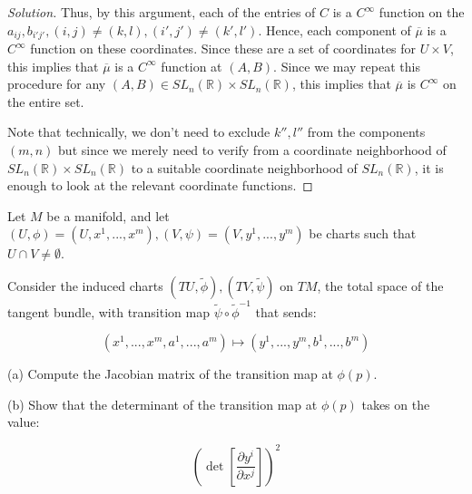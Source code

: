 \documentclass[10pt]{article}
\theoremstyle{nonumberplain}%
\newenvironment{problem}[2][]{\begin{trivlist}
\item[\hskip \labelsep {\bfseries #1}\hskip \labelsep {\bfseries #2.}]}{\end{trivlist}}
\begin{document}
\begin{proof}[Solution]
Thus, by this argument, each of the entries of $C$ is a $C^\infty$ function on the $a_{ij}, b_{i'j'}, (i,j) \not= (k,l), (i', j') \not=(k',l')$. Hence, each component of $\overline{\mu}$ is a $C^\infty$ function on these coordinates. Since these are a set of coordinates for $U \times V$, this implies that $\overline{\mu}$ is a $C^\infty$ function at $(A,B)$. Since we may repeat this procedure for any $(A,B) \in  SL_n(\mathbb{R}) \times SL_n(\mathbb{R})$, this implies that $\overline{\mu}$ is $C^\infty$ on the entire set.

Note that technically, we don't need to exclude $k'', l''$ from the components $(m,n)$ but since we merely need to verify from a coordinate neighborhood of $ SL_n(\mathbb{R}) \times SL_n(\mathbb{R})$ to a suitable coordinate neighborhood of $ SL_n(\mathbb{R})$, it is enough to look at the relevant coordinate functions.

\end{proof}

\begin{problem}{Question 5}

Let $M$ be a manifold, and let $(U, \phi) = (U, x^1,...,x^m), (V, \psi) = (V, y^1,...,y^m)$ be charts such that $U \cap V \not = \emptyset$.

Consider the induced charts $(TU, \tilde{\phi}),(TV, \tilde{\psi})$ on $TM$, the total space of the tangent bundle, with transition map $\tilde{\psi} \circ \tilde{\phi}^{-1}$ that sends:

$$ (x^1,...,x^m, a^1,...,a^m) \mapsto (y^1,...,y^m, b^1,...,b^m)$$

(a) Compute the Jacobian matrix of the transition map at $\phi(p)$.

(b) Show that the determinant of the transition map at $\phi(p)$ takes on the value:

$$ \left( \det\left[\frac{\partial y^i}{\partial x^j}\right]\right)^2 $$

\end{problem}
\end{document}
